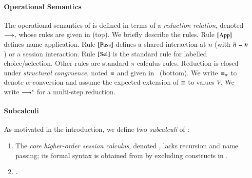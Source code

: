 \documentclass[preprint,11pt]{elsarticle}
\begin{document}
{%






\paragraph{Operational Semantics}
The  operational semantics of \HOp is defined in terms of a \emph{reduction relation}, 
denoted $\longrightarrow$, whose rules are
given in 
  (top).
 We briefly describe the rules. 
Rule ${\scriptsize{[\textrm{\small App}]}}$ defines  name application.
Rule ${\scriptsize{[\textrm{\small Pass}]}}$ defines a shared interaction at $n$ 
(with $\overline{n}=n$) or a session interaction.
Rule ${\scriptsize{[\textrm{\small Sel}]}}$ is the standard rule for labelled choice/selection. %
Other rules are standard $\pi$-calculus rules.
Reduction is closed under \emph{structural congruence}, 
noted $\equiv$ and given in ~(bottom). 
We 
write $\equiv_\alpha$ to denote $\alpha$-conversion and 
assume the expected extension of $\equiv$ to values $V$.
We write $\longrightarrow^\ast$ for a multi-step reduction.



\paragraph{Subcalculi}
As motivated in the introduction, 
we define two \emph{subcalculi} of \HOp: 
\begin{enumerate}[$\bullet$]
	\item	The  
		{\em core higher-order session calculus}, denoted \HO,
		 lacks recursion and name passing; its 
		formal syntax is obtained from  by excluding 
		constructs in .

	\item	{}.


\end{enumerate}}
\end{document}
